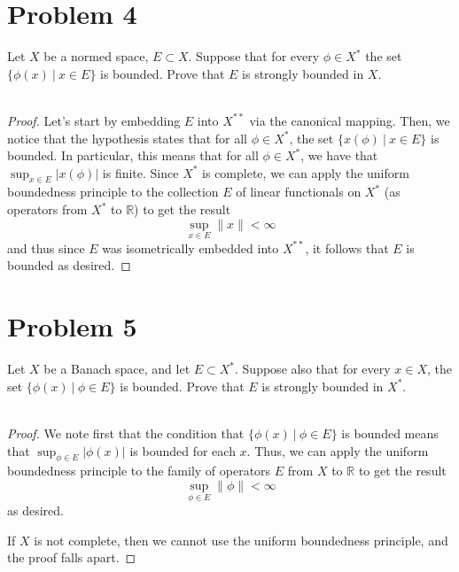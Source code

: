 \documentclass[fontsize=11pt]{scrartcl} %
\numberwithin{equation}{section} %
\numberwithin{figure}{section} %
\numberwithin{table}{section} %
\newcommand{\R}{\mathbb{R}}
\begin{document}
\section*{Problem 4}
Let $X$ be a normed space, $E\subset X$. Suppose that for every $\phi\in X^*$
the set $\{\phi(x)\ |\ x\in E\}$ is bounded. Prove that $E$ is strongly bounded
in $X$.
\\
\\
\begin{proof}
    Let's start by embedding $E$ into $X^{**}$ via the canonical mapping. Then,
    we notice that the hypothesis states that for all $\phi\in X^*$, the set
    $\{x(\phi)\ |\ x\in E\}$ is bounded. In particular, this means that for all
    $\phi\in X^*$, we have that $\sup_{x\in E} |x(\phi)|$ is finite. Since $X^*$
    is complete, we can apply the uniform boundedness principle to the
    collection $E$ of linear functionals on $X^*$ (as operators from $X^*$ to
    $\R$) to get the result
    \[
        \sup_{x\in E}\|x\| < \infty
    \]
    and thus since $E$ was isometrically embedded into $X^{**}$, it follows that
    $E$ is bounded as desired.
\end{proof}

\section*{Problem 5}
Let $X$ be a Banach space, and let $E\subset X^*$. Suppose also that for every
$x\in X$, the set $\{\phi(x)\ |\ \phi\in E\}$ is bounded. Prove that $E$ is
strongly bounded in $X^*$.
\\
\\
\begin{proof}
    We note first that the condition that $\{\phi(x)\ |\ \phi\in E\}$ is bounded
    means that $\sup_{\phi\in E} |\phi(x)|$ is bounded for each $x$. Thus, we
    can apply the uniform boundedness principle to the family of operators $E$
    from $X$ to $\R$ to get the result
    \[
        \sup_{\phi\in E} \|\phi\|<\infty
    \]
    as desired.

    If $X$ is not complete, then we cannot use the uniform boundedness
    principle, and the proof falls apart.
\end{proof}
\end{document}
